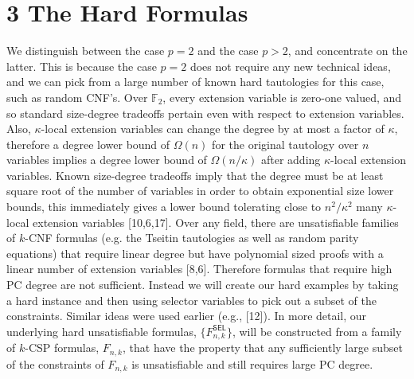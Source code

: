 \documentclass[10pt,a4paper]{article}
\begin{document}
\section*{3 The Hard Formulas}
We distinguish between the case $p=2$ and the case $p>2$, and concentrate on the latter. This is because the case $p=2$ does not require any new technical ideas, and we can pick from a large number of known hard tautologies for this case, such as random CNF's. Over $\mathbb F_2$, every extension variable is zero-one valued, and so standard size-degree tradeoffs pertain even with respect to extension variables. Also, $\kappa$-local extension variables can change the degree by at most a factor of $\kappa$, therefore a degree lower bound of $\Omega(n)$ for the original tautology over $n$ variables implies a degree lower bound of $\Omega(n/\kappa)$ after adding $\kappa$-local extension variables. Known size-degree tradeoffs imply that the degree must be at least square root of the number of variables in order to obtain exponential size lower bounds, this immediately gives a lower bound tolerating close to $n^2/\kappa^2$ many $\kappa$-local extension variables [10,6,17].
Over any field, there are unsatisfiable families of $k$-CNF formulas (e.g. the Tseitin tautologies as well as random parity equations) that require linear degree but have polynomial sized proofs with a linear number of extension variables [8,6]. Therefore formulas that require high PC degree are not sufficient. Instead we will create our hard examples by taking a hard instance and then using selector variables to pick out a subset of the constraints. Similar ideas were used earlier (e.g., [12]). In more detail, our underlying hard unsatisfiable formulas, $\{F^{\mathsf{SEL}}_{n,k}\}$, will be constructed from a family of $k$-CSP formulas, $F_{n,k}$, that have the property that any sufficiently large subset of the constraints of $F_{n,k}$ is unsatisfiable and still requires large PC degree.
\end{document}
